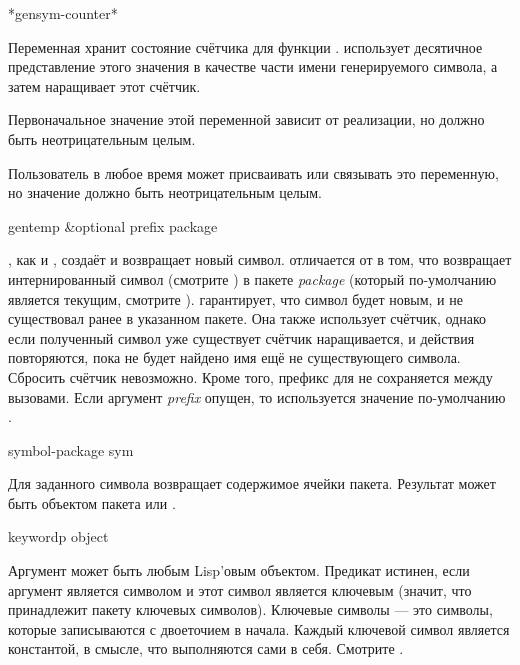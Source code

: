 \begin{newer}
\begin{defun}[Variable]
*gensym-counter*

Переменная хранит состояние счётчика для функции . 
использует десятичное представление этого значения в качестве части имени
генерируемого символа, а затем наращивает этот счётчик.

Первоначальное значение этой переменной зависит от реализации, но должно быть
неотрицательным целым.

Пользователь в любое время может присваивать или связывать это переменную, но
значение должно быть неотрицательным целым.
\end{defun}
\end{newer}

\begin{defun}[Function]
gentemp &optional prefix package

, как и , создаёт и возвращает новый символ.
 отличается от  в том, что возвращает интернированный
символ (смотрите ) в пакете \emph{package} (который по-умолчанию
является текущим, смотрите ).  гарантирует, что
символ будет новым, и не существовал ранее в указанном пакете. Она также
использует счётчик, однако если полученный символ уже существует счётчик
наращивается, и действия повторяются, пока не будет найдено имя ещё не
существующего символа.
Сбросить счётчик невозможно.
Кроме того, префикс для  не сохраняется между вызовами. Если
аргумент \emph{prefix} опущен, то используется значение по-умолчанию .
\end{defun}

\begin{defun}[Function]
symbol-package sym

Для заданного символа возвращает содержимое ячейки пакета. Результат может быть
объектом пакета или {\nil}.
\end{defun}

\begin{defun}[Function]
keywordp object

Аргумент может быть любым Lisp'овым объектом. Предикат  истинен,
если аргумент является символом и этот символ является ключевым (значит, что
принадлежит пакету ключевых символов). Ключевые символы --- это символы, которые
записываются с двоеточием в начала. Каждый ключевой символ является константой,
в смысле, что выполняются сами в себя. Смотрите .
\end{defun}

\fi